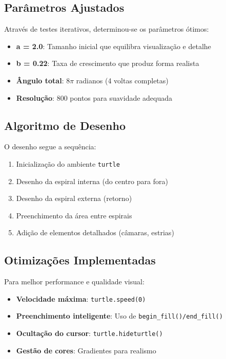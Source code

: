 \documentclass[12pt,a4paper,oneside]{extarticle}
\begin{document}
\subsection{Parâmetros Ajustados}
Através de testes iterativos, determinou-se os parâmetros ótimos:

\begin{itemize}
    \item \textbf{a = 2.0}: Tamanho inicial que equilibra visualização e detalhe
    \item \textbf{b = 0.22}: Taxa de crescimento que produz forma realista
    \item \textbf{Ângulo total}: $8\pi$ radianos (4 voltas completas)
    \item \textbf{Resolução}: 800 pontos para suavidade adequada
\end{itemize}

\subsection{Algoritmo de Desenho}
O desenho segue a sequência:

\begin{enumerate}
    \item Inicialização do ambiente \texttt{turtle}
    \item Desenho da espiral interna (do centro para fora)
    \item Desenho da espiral externa (retorno)
    \item Preenchimento da área entre espirais
    \item Adição de elementos detalhados (câmaras, estrias)
\end{enumerate}

\subsection{Otimizações Implementadas}
Para melhor performance e qualidade visual:

\begin{itemize}
    \item \textbf{Velocidade máxima}: \texttt{turtle.speed(0)}
    \item \textbf{Preenchimento inteligente}: Uso de \texttt{begin\_fill()/end\_fill()}
    \item \textbf{Ocultação do cursor}: \texttt{turtle.hideturtle()}
    \item \textbf{Gestão de cores}: Gradientes para realismo
\end{itemize}
\end{document}
